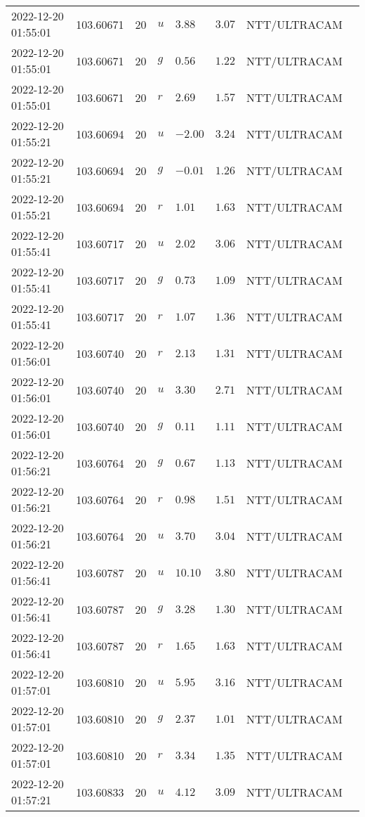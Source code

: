 \documentclass{nature_plusfigure}
\begin{document}
\begin{supplement}
\begin{center}
\begin{longtable}{llllllll}
2022-12-20 01:55:01 & 103.60671 & 20 & $u$ & $3.88$ & $3.07$ & NTT/ULTRACAM &  \\ 
2022-12-20 01:55:01 & 103.60671 & 20 & $g$ & $0.56$ & $1.22$ & NTT/ULTRACAM &  \\ 
2022-12-20 01:55:01 & 103.60671 & 20 & $r$ & $2.69$ & $1.57$ & NTT/ULTRACAM &  \\ 
2022-12-20 01:55:21 & 103.60694 & 20 & $u$ & $-2.00$ & $3.24$ & NTT/ULTRACAM &  \\ 
2022-12-20 01:55:21 & 103.60694 & 20 & $g$ & $-0.01$ & $1.26$ & NTT/ULTRACAM &  \\ 
2022-12-20 01:55:21 & 103.60694 & 20 & $r$ & $1.01$ & $1.63$ & NTT/ULTRACAM &  \\ 
2022-12-20 01:55:41 & 103.60717 & 20 & $u$ & $2.02$ & $3.06$ & NTT/ULTRACAM &  \\ 
2022-12-20 01:55:41 & 103.60717 & 20 & $g$ & $0.73$ & $1.09$ & NTT/ULTRACAM &  \\ 
2022-12-20 01:55:41 & 103.60717 & 20 & $r$ & $1.07$ & $1.36$ & NTT/ULTRACAM &  \\ 
2022-12-20 01:56:01 & 103.60740 & 20 & $r$ & $2.13$ & $1.31$ & NTT/ULTRACAM &  \\ 
2022-12-20 01:56:01 & 103.60740 & 20 & $u$ & $3.30$ & $2.71$ & NTT/ULTRACAM &  \\ 
2022-12-20 01:56:01 & 103.60740 & 20 & $g$ & $0.11$ & $1.11$ & NTT/ULTRACAM &  \\ 
2022-12-20 01:56:21 & 103.60764 & 20 & $g$ & $0.67$ & $1.13$ & NTT/ULTRACAM &  \\ 
2022-12-20 01:56:21 & 103.60764 & 20 & $r$ & $0.98$ & $1.51$ & NTT/ULTRACAM &  \\ 
2022-12-20 01:56:21 & 103.60764 & 20 & $u$ & $3.70$ & $3.04$ & NTT/ULTRACAM &  \\ 
2022-12-20 01:56:41 & 103.60787 & 20 & $u$ & $10.10$ & $3.80$ & NTT/ULTRACAM &  \\ 
2022-12-20 01:56:41 & 103.60787 & 20 & $g$ & $3.28$ & $1.30$ & NTT/ULTRACAM &  \\ 
2022-12-20 01:56:41 & 103.60787 & 20 & $r$ & $1.65$ & $1.63$ & NTT/ULTRACAM &  \\ 
2022-12-20 01:57:01 & 103.60810 & 20 & $u$ & $5.95$ & $3.16$ & NTT/ULTRACAM &  \\ 
2022-12-20 01:57:01 & 103.60810 & 20 & $g$ & $2.37$ & $1.01$ & NTT/ULTRACAM &  \\ 
2022-12-20 01:57:01 & 103.60810 & 20 & $r$ & $3.34$ & $1.35$ & NTT/ULTRACAM &  \\ 
2022-12-20 01:57:21 & 103.60833 & 20 & $u$ & $4.12$ & $3.09$ & NTT/ULTRACAM &  \\ 

\end{longtable}
\end{center}
\end{supplement}
\end{document}
